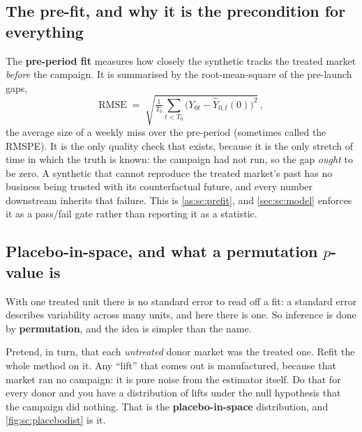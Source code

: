 

\subsection*{The pre-fit, and why it is the precondition for everything}

The \textbf{pre-period fit} measures how closely the synthetic tracks the treated market
\emph{before} the campaign. It is summarised by the root-mean-square of the pre-launch gaps,
%
\begin{equation}
  \text{RMSE} \;=\; \sqrt{\tfrac{1}{T_0}\sum_{t < T_0}\big(Y_{0t} - \widehat{Y}_{0,t}(0)\big)^{2}}\,,
  \label{eq:sc:rmse}
\end{equation}
%
the average size of a weekly miss over the pre-period (sometimes called the RMSPE). It is the only
quality check that exists, because it is the only stretch of time in which the truth is known: the
campaign had not run, so the gap \emph{ought} to be zero. A synthetic that cannot reproduce the
treated market's past has no business being trusted with its counterfactual future, and every
number downstream inherits that failure. This is \cref{as:sc:prefit}, and \cref{sec:sc:model}
enforces it as a pass/fail gate rather than reporting it as a statistic.

\subsection*{Placebo-in-space, and what a permutation \texorpdfstring{$p$}{p}-value is}

With one treated unit there is no standard error to read off a fit: a standard error describes
variability across many units, and here there is one. So inference is done by
\textbf{permutation}, and the idea is simpler than the name.

Pretend, in turn, that each \emph{untreated} donor market was the treated one. Refit the whole
method on it. Any ``lift'' that comes out is manufactured, because that market ran no campaign:
it is pure noise from the estimator itself. Do that for every donor and you have a distribution of
lifts under the null hypothesis that the campaign did nothing. That is the
\textbf{placebo-in-space} distribution, and \cref{fig:sc:placebodist} is it.

